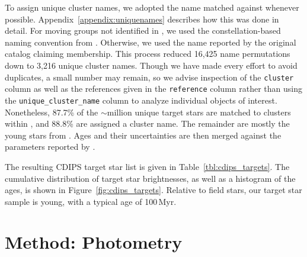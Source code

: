 \documentclass[12pt,twocolumn,tighten]{aastex62}
\begin{document}
To assign unique cluster names, we adopted the name matched against
\citet{Kharchenko_et_al_2013} whenever possible.
Appendix~\ref{appendix:uniquenames} describes  how this was done in detail.
For moving groups not identified in \citet{Kharchenko_et_al_2013}, we used
the constellation-based naming convention from
\citet{gagne_banyan_XI_2018}.  Otherwise, we used the name reported by
the original catalog claiming membership.  This process reduced 16,425
name permutations down to 3,216 unique cluster names.  Though we have
made every effort to avoid duplicates, a small number may remain, so we
advise inspection of the \texttt{cluster} column
as well as the references given in the
\texttt{reference} column rather than using the
\texttt{unique\_cluster\_name} column to analyze individual objects
of interest.  Nonetheless, 87.7\% of the $\sim$million unique target
stars are matched to clusters within \citet{Kharchenko_et_al_2013},
and 88.8\% are assigned a cluster name.  The remainder are mostly the
young stars from \citet{zari_3d_2018}.
Ages and their uncertainties are then merged against the 
parameters reported by \citet{Kharchenko_et_al_2013}.

The resulting CDIPS target star list is given in
Table~\ref{tbl:cdips_targets}.  The cumulative distribution of target
star brightnesses, as well as a histogram of the ages, is shown in
Figure~\ref{fig:cdips_targets}.  Relative to field stars, our target
star sample is young, with a typical age of 100$\,$Myr.






\section{Method: Photometry}
\label{sec:method}
\end{document}
